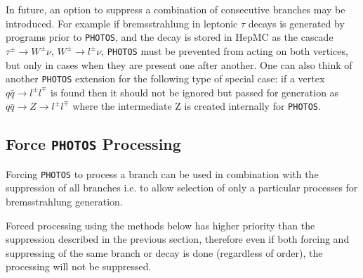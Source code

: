 \documentclass[]{Photos_interface_design}
\begin{document}
In future, an option to suppress a combination of consecutive branches may be introduced.
For example if bremsstrahlung in leptonic $\tau$ decays is generated by
programs prior to {\tt PHOTOS}, and the decay is stored in HepMC as the cascade
$\tau^\pm \to W^\pm \nu$, $W^\pm \to l^\pm \nu$, {\tt PHOTOS} must
be prevented from acting on both vertices, but only in cases when they are present one after another.
One can also think of another {\tt PHOTOS} extension for the following type of special case: if a vertex $q
\bar q \to l^\pm l^\mp$ is found then it should not be ignored but
passed for generation as $q \bar q \to Z \to l^\pm l^\mp$ where
the intermediate Z is created internally for {\tt PHOTOS}.

\subsection{Force {\tt PHOTOS} Processing }
\label{section:force}

Forcing {\tt PHOTOS} to process a branch can be used in combination with
the suppression of all branches i.e. to allow selection of only a particular
processes for bremsstrahlung generation.

Forced processing using the methods below has higher priority than the suppression described
in the previous section, therefore even if both forcing and suppressing of the same
branch or decay is done (regardless of order), the processing will not be
suppressed.
\end{document}
